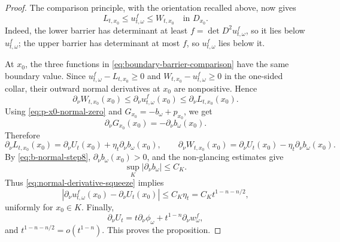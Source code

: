 \documentclass[10pt,a4paper]{amsart}
\begin{document}
\begin{proof}
The comparison principle, with the orientation recalled above, now gives
\begin{equation}\label{eq:boundary-barrier-comparison}
    L_{t,x_0}\le u_{t,\omega}^f\le W_{t,x_0}
    \quad\text{in }D_{x_0}.
\end{equation}
Indeed, the lower barrier has determinant at least \(f=\det D^2u_{t,\omega}^f\), so it lies below \(u_{t,\omega}^f\); the upper barrier has determinant at most \(f\), so \(u_{t,\omega}^f\) lies below it.

At \(x_0\), the three functions in \eqref{eq:boundary-barrier-comparison} have the same boundary value.  Since \(u_{t,\omega}^f-L_{t,x_0}\ge0\) and \(W_{t,x_0}-u_{t,\omega}^f\ge0\) in the one-sided collar, their outward normal derivatives at \(x_0\) are nonpositive.  Hence
\begin{equation}\label{eq:normal-derivative-squeeze}
    \partial_\nu W_{t,x_0}(x_0)
    \le
    \partial_\nu u_{t,\omega}^f(x_0)
    \le
    \partial_\nu L_{t,x_0}(x_0).
\end{equation}
Using \eqref{eq:p-x0-normal-zero} and \(G_{x_0}=-b_\omega+p_{x_0}\), we get
\[
    \partial_\nu G_{x_0}(x_0)=-\partial_\nu b_\omega(x_0).
\]
Therefore
\[
    \partial_\nu L_{t,x_0}(x_0)
    =
    \partial_\nu U_t(x_0)
    +\eta_t\partial_\nu b_\omega(x_0),
    \qquad
    \partial_\nu W_{t,x_0}(x_0)
    =
    \partial_\nu U_t(x_0)
    -\eta_t\partial_\nu b_\omega(x_0).
\]
By \eqref{eq:b-normal-step8}, \(\partial_\nu b_\omega(x_0)>0\), and the non-glancing estimates give
\[
    \sup_K |\partial_\nu b_\omega|\le C_K .
\]
Thus \eqref{eq:normal-derivative-squeeze} implies
\[
    \left|
        \partial_\nu u_{t,\omega}^f(x_0)
        -\partial_\nu U_t(x_0)
    \right|
    \le C_K\eta_t
    =C_Kt^{1-n-n/2},
\]
uniformly for \(x_0\in K\).  Finally,
\[
    \partial_\nu U_t
    =
    t\partial_\nu\phi_\omega
    +
    t^{1-n}\partial_\nu w_\omega^f,
\]
and \(t^{1-n-n/2}=o(t^{1-n})\).  This proves the proposition.
\end{proof}
\end{document}
